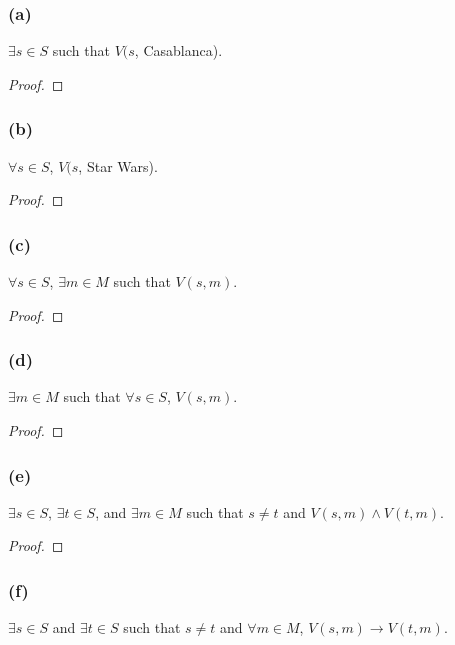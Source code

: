 \documentclass[14pt]{extarticle}
\newcommand{\fa}{\forall}
\newcommand{\te}{\exists}
\begin{document}
\subsubsection{(a)}
$\te s \in S$ such that $V(s$, Casablanca).

\begin{proof}

\end{proof}

\subsubsection{(b)}
$\fa s \in S$, $V(s$, Star Wars).

\begin{proof}

\end{proof}

\subsubsection{(c)}
$\fa s \in S$, $\te m \in M$ such that $V(s, m)$.

\begin{proof}

\end{proof}

\subsubsection{(d)}
$\te m \in M$ such that $\fa s \in S$, $V(s, m)$.

\begin{proof}

\end{proof}

\subsubsection{(e)}
$\te s \in S$, $\te t \in S$, and $\te m \in M$ such that $s \neq t$ and $V(s, m) \wedge V(t, m)$.

\begin{proof}

\end{proof}

\subsubsection{(f)}
$\te s \in S$ and $\te t \in S$ such that $s \neq t$ and $\fa m \in M$, $V(s, m) \to V(t, m)$.
\end{document}
